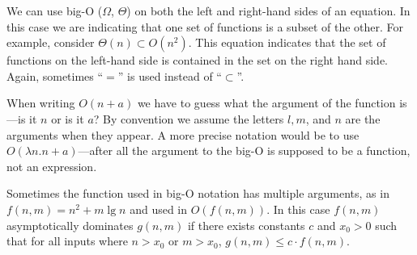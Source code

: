 \begin{cluster}
\label{grp:grm:analysis::asymptotics::subsets}

\begin{gram}[Subsets]
\label{grm:analysis::asymptotics::subsets}
We can use big-O ($\Omega$, $\Theta$) on both the left and right-hand sides of an equation.
In this case we are indicating that one set of functions is
a subset of the other.
For example, consider $\Theta(n) \subset O(n^2)$.
This equation indicates that the set of functions on the left-hand side is contained in
the set on the right hand side.  
Again, sometimes ``$=$'' is used instead of ``$\subset$''.

\end{gram}
\end{cluster}

\begin{cluster}
\label{grp:grm:analysis::asymptotics::the-argument}

\begin{gram}
\label{grm:analysis::asymptotics::the-argument}
  When writing $O(n + a)$ we have to guess what the argument of the
  function is---is it $n$ or is it $a$?   By convention we assume the
  letters $l, m$, and $n$ are
  the arguments when they appear.  A more precise notation would be
  to use $O(\lambda n . n + a)$---after all the
  argument to the big-O is supposed to be a function, not an
  expression.

\end{gram}
\end{cluster}

\begin{cluster}
\label{grp:grm:analysis::asymptotics::multiple-arguments}

\begin{gram}
\label{grm:analysis::asymptotics::multiple-arguments}
  Sometimes the function used in big-O notation has multiple
  arguments, as in $f(n,m) = n^2 + m \lg n$ and used in $O(f(n,m))$.
  In this case $f(n,m)$ asymptotically dominates $g(n,m)$ if there
  exists constants $c$ and $x_0 > 0$ such that for all inputs where
  $n > x_0$ or $m > x_0$, $g(n, m) \leq c \cdot f(n,m)$.  
 

\end{gram}
\end{cluster}

